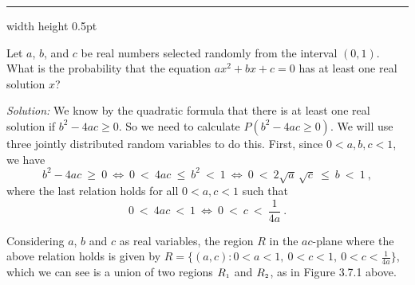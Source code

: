 \medskip
\hrule width \textwidth height 0.5pt
\begin{exmp}\label{exmp:quadprob}
 Let $a$, $b$, and $c$ be real numbers selected randomly from the interval $(0,1)$. What is the probability that the
 equation $ax^2 + bx + c = 0$ has at least one real solution $x$?\smallskip

 \par\noindent \emph{Solution:} We know by the quadratic formula that there is at least one real solution if
 $b^2 - 4ac \ge 0$. So we need to calculate $P(b^2 - 4ac \ge 0)$. We will use three jointly distributed random variables
 to do this. First, since $0 < a,b,c < 1$, we have
  \begin{displaymath}
  b^2 - 4ac ~\ge~ 0 ~\Leftrightarrow~ 0 ~<~ 4ac ~\le~ b^2 ~<~ 1 ~\Leftrightarrow~ 0 ~<~ 2\sqrt{a}\,\sqrt{c} ~\le~ b ~<~ 1 ~,
 \end{displaymath}
 where the last relation holds for all $0 < a,c < 1$ such that
 \begin{displaymath}
 0 ~<~ 4ac ~<~ 1 ~\Leftrightarrow~ 0 ~<~ c ~<~ \frac{1}{4a} ~.
 \end{displaymath}
 
 Considering $a$, $b$ and $c$ as real variables, the region $R$ in the $ac$-plane where the above relation holds is
 given by
 $R = \lbrace (a,c): 0 < a < 1,~0 < c < 1,~0 < c < \frac{1}{4a} \rbrace$, which we can see is a union of two regions
 $R_{\scriptscriptstyle 1}$ and $R_{\scriptscriptstyle 2}$, as in  Figure 3.7.1 above.
 

\end{exmp}
